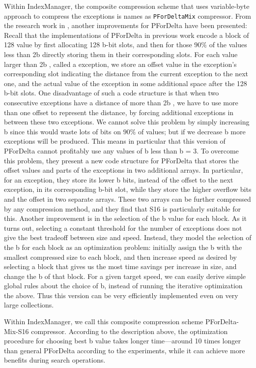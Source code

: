 \begin{enumerate}
Within IndexManager, the composite compression scheme that uses variable-byte approach to compress the exceptions is names as \texttt{PForDeltaMix} compressor.
From the research work in \cite{yan2009compressing}, another improvements for PForDelta have been presented: Recall that the implementations of PForDelta 
in previous work encode a block of 128 value by first allocating 128 b-bit slots, and then for those $90\%$ of the values less than 2b directly storing them in their 
corresponding slots. For each value larger than 2b , called a exception, we store an offset value in the exception's corresponding slot indicating the distance from 
the current exception to the next one, and the actual value of the exception in some additional space after the 128 b-bit slots. One disadvantage of such a code 
structure is that when two consecutive exceptions have a distance of more than 2b , we have to use more than one offset to represent the distance, by forcing 
additional exceptions in between these two exceptions. We cannot solve this problem by simply increasing b since this would waste lots of bits on $90\%$ of values; 
but if we decrease b more exceptions will be produced. This means in particular that this version of PForDelta cannot profitably use any values of b less than b = 3.
To overcome this problem, they present a new code structure for PForDelta that stores the offset values and parts of the exceptions in two additional arrays. 
In particular, for an exception, they store its lower b bits, instead of the offset to the next exception, in its corresponding b-bit slot, while they store the higher overflow
bits and the offset in two separate arrays.  These two arrays can be further compressed by any compression method, and they find that S16 is particularly suitable for
this. Another improvement is in the selection of the b value for each block. As it turns out, selecting a constant threshold for the number of exceptions does not 
give the best tradeoff between size and speed. Instead, they model the selection of the b for each block as an optimization problem: initially assign the b with the
smallest compressed size to each block, and then increase speed as desired by selecting a block that gives us the most time savings per increase in size, and change the b 
of that block. For a given target speed, we can easily derive simple global rules about the choice of b, instead of running the iterative optimization the above. Thus this 
version can be very efficiently implemented even on very large collections.

\par
Within IndexManager, we call this composite compression scheme PForDelta-Mix-S16 compressor. According to the description above, the optimization procedure for choosing
best b value takes longer time---around 10 times longer than general PForDelta according to the experiments, while it can achieve more benefits during search operations. 
\end{enumerate}

